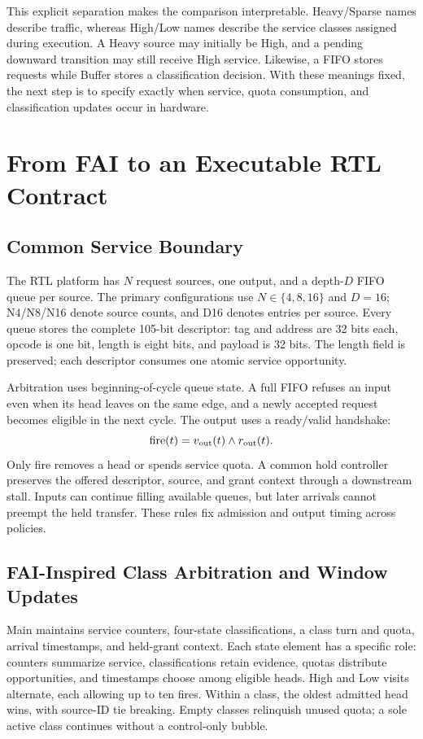 This explicit separation makes the comparison interpretable. Heavy/Sparse names describe traffic, whereas High/Low names describe the service classes assigned during execution. A Heavy source may initially be High, and a pending downward transition may still receive High service. Likewise, a FIFO stores requests while Buffer stores a classification decision. With these meanings fixed, the next step is to specify exactly when service, quota consumption, and classification updates occur in hardware.

\section{From FAI to an Executable RTL Contract}
\label{sec:rtl}
\subsection{Common Service Boundary}
The RTL platform has $N$ request sources, one output, and a depth-$D$ FIFO queue per source. The primary configurations use $N\in\{4,8,16\}$ and $D=16$; N4/N8/N16 denote source counts, and D16 denotes entries per source. Every queue stores the complete 105-bit descriptor: tag and address are 32 bits each, opcode is one bit, length is eight bits, and payload is 32 bits. The length field is preserved; each descriptor consumes one atomic service opportunity.

Arbitration uses beginning-of-cycle queue state. A full FIFO refuses an input even when its head leaves on the same edge, and a newly accepted request becomes eligible in the next cycle. The output uses a ready/valid handshake:
\begin{equation}
\mathrm{fire}(t)=v_{\rm out}(t)\land r_{\rm out}(t).
\label{eq:fire-v3}
\end{equation}
Only fire removes a head or spends service quota. A common hold controller preserves the offered descriptor, source, and grant context through a downstream stall. Inputs can continue filling available queues, but later arrivals cannot preempt the held transfer. These rules fix admission and output timing across policies.

\subsection{FAI-Inspired Class Arbitration and Window Updates}
Main maintains service counters, four-state classifications, a class turn and quota, arrival timestamps, and held-grant context. Each state element has a specific role: counters summarize service, classifications retain evidence, quotas distribute opportunities, and timestamps choose among eligible heads. High and Low visits alternate, each allowing up to ten fires. Within a class, the oldest admitted head wins, with source-ID tie breaking. Empty classes relinquish unused quota; a sole active class continues without a control-only bubble.

